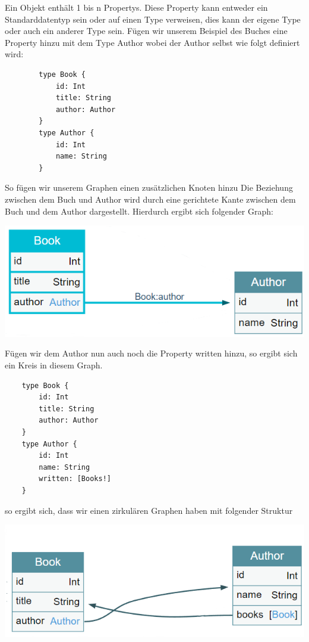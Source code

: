 Ein Objekt enthält 1 bis n Propertys. Diese Property kann entweder ein Standarddatentyp sein oder auf einen Type verweisen,
dies kann der eigene Type oder auch ein anderer Type sein.
Fügen wir unserem Beispiel des Buches eine Property hinzu mit dem Type Author wobei der Author selbst
wie folgt definiert wird:

\begin{center}
    \begin{verbatim}
        type Book {
            id: Int
            title: String
            author: Author
        }
        type Author {
            id: Int
            name: String
        }
    \end{verbatim}
\end{center}

So fügen wir unserem Graphen einen zusätzlichen Knoten hinzu
Die Beziehung zwischen dem Buch und Author wird durch eine gerichtete Kante zwischen dem Buch und dem Author dargestellt.
Hierdurch ergibt sich folgender Graph:

\begin{center}
    \includegraphics[width=\textwidth,height=\textheight,keepaspectratio]{img/book-author}
\end{center}

Fügen wir dem Author nun auch noch die Property written hinzu, so ergibt sich ein Kreis in diesem Graph.

\begin{verbatim}
    type Book {
        id: Int
        title: String
        author: Author
    }
    type Author {
        id: Int
        name: String
        written: [Books!]
    }
\end{verbatim}

so ergibt sich, dass wir einen zirkulären Graphen haben mit folgender Struktur

\begin{center}
    \includegraphics[width=\textwidth,height=\textheight,keepaspectratio]{img/book-author-circle}
\end{center}


